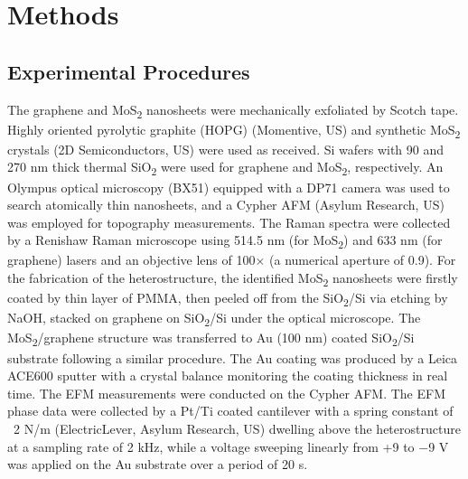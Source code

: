 \section{Methods}
\label{sec:asym-methods}

\subsection*{Experimental Procedures}
\label{sec:asym-exper-proc}

The graphene and MoS\textsubscript{2} nanosheets were mechanically
exfoliated by Scotch tape. Highly oriented pyrolytic graphite (HOPG)
(Momentive, US) and synthetic MoS\textsubscript{2} crystals (2D
Semiconductors, US) were used as received. Si wafers with 90 and 270
nm thick thermal SiO\textsubscript{2} were used for graphene and
MoS\textsubscript{2}, respectively. An Olympus optical microscopy
(BX51) equipped with a DP71 camera was used to search atomically thin
nanosheets, and a Cypher AFM (Asylum Research, US) was employed for
topography measurements. The Raman spectra were collected by a
Renishaw Raman microscope using 514.5 nm (for MoS\textsubscript{2})
and 633 nm (for graphene) lasers and an objective lens of 100× (a
numerical aperture of 0.9). For the fabrication of the
heterostructure, the identified MoS\textsubscript{2} nanosheets were
firstly coated by thin layer of PMMA, then peeled off from the
SiO\textsubscript{2}/Si via etching by NaOH, stacked on graphene on
SiO\textsubscript{2}/Si under the optical microscope. The
MoS\textsubscript{2}/graphene structure was transferred to Au (100 nm)
coated SiO\textsubscript{2}/Si substrate following a similar
procedure. The Au coating was produced by a Leica ACE600 sputter with
a crystal balance monitoring the coating thickness in real time. The
EFM measurements were conducted on the Cypher AFM. The EFM phase data
were collected by a Pt/Ti coated cantilever with a spring constant of
~2 N/m (ElectricLever, Asylum Research, US) dwelling above the
heterostructure at a sampling rate of 2 kHz, while a voltage sweeping
linearly from +9 to −9 V was applied on the Au substrate over a period
of 20 s.

